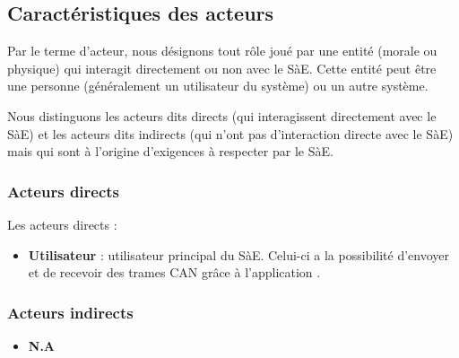 \subsection{Caractéristiques des acteurs}
Par le terme d’acteur, nous désignons tout rôle joué par une entité (morale ou physique) qui interagit directement ou non avec le SàE. Cette entité peut être une personne (généralement un utilisateur du système) ou un autre système. 

\vspace{\baselineskip} %
Nous distinguons les acteurs dits directs (qui interagissent directement avec le SàE) et les acteurs dits indirects (qui n’ont pas d’interaction directe avec le SàE) mais qui sont à l’origine d’exigences à respecter par le SàE.

\subsubsection{Acteurs directs}
Les acteurs directs : 
\vspace{0.2cm} %
\begin{itemize} 
    \item \textbf{Utilisateur} : utilisateur principal du SàE. Celui-ci a la possibilité d'envoyer et de recevoir des trames CAN grâce à l'application {\nomApplication}.
\end{itemize}
\subsubsection{Acteurs indirects}
\vspace{0.2cm} %
\begin{itemize} 
    \item \textbf{N.A}
\end{itemize}